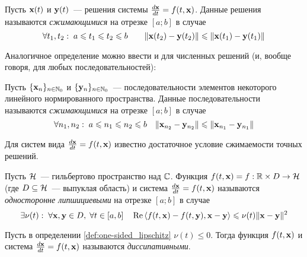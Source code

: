 \begin{definition}
    \label{def:contractivity}
    Пусть $ \mathbf{x}(t) $ и $ \mathbf{y}(t) $~--- решения системы $ \frac{d \mathbf{x}}{d t} = f(t, \mathbf{x}) $.
    Данные решения называются \emph{сжимающимися} на отрезке $ [a; b] $ в случае
    \[
        \forall t_1, t_2: \; a \leqslant t_1 \leqslant t_2 \leqslant b \qquad \| \mathbf{x}(t_2) - \mathbf{y}(t_2) \| \leqslant \| \mathbf{x}(t_1) - \mathbf{y}(t_1) \|
    \]
\end{definition}

Аналогичное определение можно ввести и для численных решений (и, вообще говоря, для любых последовательностей):

\begin{definition}
    \label{def:contractivity_sequence}
    Пусть $ \{\mathbf{x}_n\}_{n \in \mathbb{N}_0} $ и $ \{\mathbf{y}_n\}_{n \in \mathbb{N}_0} $~--- последовательности элементов некоторого линейного нормированного пространства.
    Данные последовательности называются \emph{сжимающимися} на отрезке $ [a; b] $ в случае
    \[
        \forall n_1, n_2: \; a \leqslant n_1 \leqslant n_2 \leqslant b \quad \| \mathbf{x}_{n_2} - \mathbf{y}_{n_2} \| \leqslant \| \mathbf{x}_{n_1} - \mathbf{y}_{n_1} \|
    \]
\end{definition}

Для систем вида $ \frac{d \mathbf{x}}{d t} = f(t, \mathbf{x}) $ известно \cite{auzinger1990note, auzinger1993modern} достаточное условие
сжимаемости точных решений.

\begin{definition}
    \label{def:one-sided_lipschitz}
    Пусть $ \mathcal{H} $~--- гильбертово пространство над $ \mathbb{C} $.
    Функция $ f(t, \mathbf{x}) = f: \mathbb{R} \times D \to \mathcal{H} $
    (где $ D \subseteq \mathcal{H} $~--- выпуклая область)
    и система $ \frac{d \mathbf{x}}{d t} = f(t, \mathbf{x}) $ называются \emph{односторонне липшициевыми} на отрезке $ [a; b] $ в случае
    \[
        \exists \nu(t): \; \forall \mathbf{x}, \mathbf{y} \in D, \; \forall t \in [a, b] \quad
        \operatorname{Re} \left\langle f(t, \mathbf{x}) - f(t, \mathbf{y}), \mathbf{x} - \mathbf{y} \right\rangle \leqslant \nu(t) \| \mathbf{x} - \mathbf{y} \|^2
    \]
\end{definition}

\begin{definition}
    \label{def:dissipative}
    Пусть в определении \ref{def:one-sided_lipschitz} $ \nu(t) \leqslant 0 $.
    Тогда функция $ f(t, \mathbf{x}) $ и система $ \frac{d \mathbf{x}}{d t} = f(t, \mathbf{x}) $ называются \emph{диссипативными}.
\end{definition}

